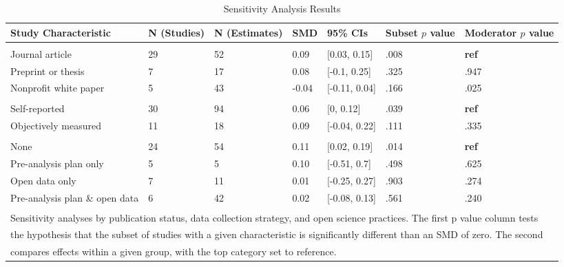 \documentclass[sn-nature,referee,pdflatex]{sn-jnl}
\begin{document}
\begin{table}[!ht]
\centering
\caption{\label{tab:table_three}Sensitivity Analysis Results}
\centering
\begin{tabular}[t]{lllllll}
\toprule
Study Characteristic & N (Studies) & N (Estimates) & SMD & 95\% CIs & Subset $p$ value & Moderator $p$ value\\
\midrule
\addlinespace[0.3em]
\multicolumn{7}{l}{\textbf{Publication Status}}\\
\hspace{1em}Journal article & 29 & 52 & 0.09 & {}[0.03, 0.15] & .008 & \textbf{ref}\\
\hspace{1em}Preprint or thesis & 7 & 17 & 0.08 & {}[-0.1, 0.25] & .325 & .947\\
\hspace{1em}Nonprofit white paper & 5 & 43 & -0.04 & {}[-0.11, 0.04] & .166 & .025\\
\addlinespace[0.3em]
\multicolumn{7}{l}{\textbf{Data Collection Strategy}}\\
\hspace{1em}Self-reported & 30 & 94 & 0.06 & {}[0, 0.12] & .039 & \textbf{ref}\\
\hspace{1em}Objectively measured & 11 & 18 & 0.09 & {}[-0.04, 0.22] & .111 & .335\\
\addlinespace[0.3em]
\multicolumn{7}{l}{\textbf{Open Science}}\\
\hspace{1em}None & 24 & 54 & 0.11 & {}[0.02, 0.19] & .014 & \textbf{ref}\\
\hspace{1em}Pre-analysis plan only & 5 & 5 & 0.10 & {}[-0.51, 0.7] & .498 & .625\\
\hspace{1em}Open data only & 7 & 11 & 0.01 & {}[-0.25, 0.27] & .903 & .274\\
\hspace{1em}Pre-analysis plan \& open data & 6 & 42 & 0.02 & {}[-0.08, 0.13] & .561 & .240\\
\bottomrule
\multicolumn{7}{l}{\textsuperscript{} Sensitivity analyses by publication status, data collection strategy, and open science practices. The first p value column tests}\\
\multicolumn{7}{l}{the hypothesis that the subset of studies with a given characteristic is significantly different than an SMD of zero. The second}\\
\multicolumn{7}{l}{compares effects within a given group, with the top category set to reference.}\\
\end{tabular}
\end{table}
\end{document}
